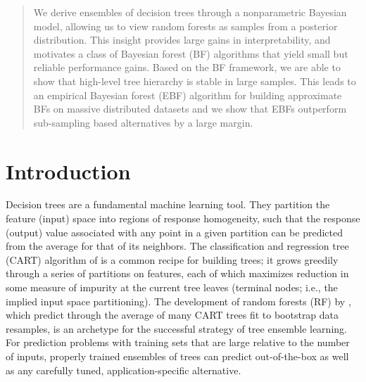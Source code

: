 \documentclass{article}
\begin{document}
 


\begin{abstract} 
We derive ensembles of decision trees through a nonparametric Bayesian model,
allowing us to view random forests as samples from a posterior distribution.
This insight provides large gains in interpretability, and motivates a class
of Bayesian forest (BF) algorithms that yield small but reliable performance
gains. Based on the BF framework, we are able to show that high-level tree
hierarchy is stable in large samples. This leads to an empirical Bayesian
forest (EBF) algorithm for building approximate BFs on massive distributed
datasets and we show that EBFs outperform sub-sampling based alternatives by a
large margin.
\end{abstract} 

\section{Introduction}\label{introduction}

Decision trees are a fundamental machine learning tool. They partition the
feature (input) space into regions of response homogeneity, such that the
response (output) value associated with any point in a given partition can be
predicted from the average for that of its neighbors. The classification and
regression tree (CART) algorithm of \cite{breiman_classification_1984} is a
common recipe for building trees; it grows greedily through a series of
partitions on features, each of which maximizes reduction in some measure of
impurity at the current tree leaves (terminal nodes; i.e., the implied input
space partitioning). The development of random forests (RF) by
\cite{breiman_random_2001}, which predict through the average of many CART
trees fit to bootstrap data resamples, is an archetype for the
successful strategy of tree ensemble learning. For prediction problems with
training sets that are large relative to the number of inputs, properly trained ensembles of
trees can predict out-of-the-box as well as any carefully tuned,
application-specific alternative.
\end{document}
